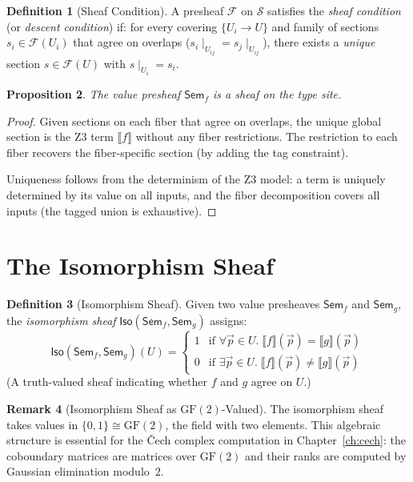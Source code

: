 \documentclass[11pt,a4paper]{report}
\theoremstyle{definition}
\newtheorem{definition}{Definition}[chapter]
\newtheorem{remark}[definition]{Remark}
\theoremstyle{plain}
\newtheorem{proposition}[definition]{Proposition}
\newcommand{\den}[1]{\llbracket #1 \rrbracket}
\newcommand{\Sem}{\mathsf{Sem}}
\newcommand{\Iso}{\mathsf{Iso}}
\newcommand{\site}{\mathcal{S}}
\newcommand{\presheaf}{\mathcal{F}}
\newcommand{\restr}[2]{#1\!\!\mid_{#2}}
\begin{document}
\begin{definition}[Sheaf Condition]
\label{def:sheaf-condition}
A presheaf $\presheaf$ on $\site$ satisfies the \emph{sheaf condition}
(or \emph{descent condition}) if: for every covering
$\{U_i \to U\}$ and family of sections $s_i \in \presheaf(U_i)$
that agree on overlaps ($\restr{s_i}{U_{ij}} = \restr{s_j}{U_{ij}}$),
there exists a \emph{unique} section $s \in \presheaf(U)$ with
$\restr{s}{U_i} = s_i$.
\end{definition}

\begin{proposition}
\label{prop:sem-sheaf}
The value presheaf $\Sem_f$ is a sheaf on the type site.
\end{proposition}

\begin{proof}
Given sections on each fiber that agree on overlaps, the unique
global section is the Z3 term $\den{f}$ without any fiber restrictions.
The restriction to each fiber recovers the fiber-specific section
(by adding the tag constraint).

Uniqueness follows from the determinism of the Z3 model: a term
is uniquely determined by its value on all inputs, and the fiber
decomposition covers all inputs (the tagged union is exhaustive).
\end{proof}

\section{The Isomorphism Sheaf}

\begin{definition}[Isomorphism Sheaf]
\label{def:iso-sheaf}
Given two value presheaves $\Sem_f$ and $\Sem_g$, the
\emph{isomorphism sheaf} $\Iso(\Sem_f, \Sem_g)$ assigns:
\[
  \Iso(\Sem_f, \Sem_g)(U) = \begin{cases}
    1 & \text{if } \forall \vec{p} \in U.\;
      \den{f}(\vec{p}) = \den{g}(\vec{p}) \\
    0 & \text{if } \exists \vec{p} \in U.\;
      \den{f}(\vec{p}) \neq \den{g}(\vec{p})
  \end{cases}
\]
(A truth-valued sheaf indicating whether $f$ and $g$ agree on $U$.)
\end{definition}

\begin{remark}[Isomorphism Sheaf as $\mathrm{GF}(2)$-Valued]
The isomorphism sheaf takes values in $\{0,1\} \cong \mathrm{GF}(2)$,
the field with two elements.  This algebraic structure is essential
for the \v{C}ech complex computation in Chapter~\ref{ch:cech}: the
coboundary matrices are matrices over $\mathrm{GF}(2)$ and their
ranks are computed by Gaussian elimination modulo~2.
\end{remark}
\end{document}
